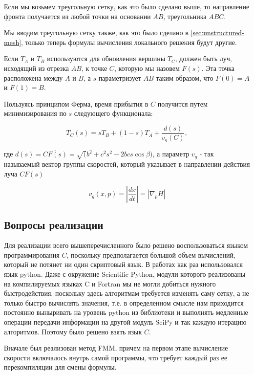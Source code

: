 Если мы возьмем треугольную сетку, как это было сделано выше, то
направление фронта получается из любой точки на основании $AB$,
треугольника $ABC$.

Мы вводим треугольную сетку также, как это было сделано в
\ref{sec:unstructured-mesh}, только теперь формулы вычисления
локального решения будут другие.

Если $T_A$ и $T_B$ используются для обновления вершины $T_C$, должен
быть луч, исходящий из отрезка $AB$, к точке $C$, которую мы назовем
$F(s)$. Эта точка расположена между $A$ и $B$, а $s$ параметризует
$AB$ таким образом, что $F(0)=A$ и $F(1) = B$.

Пользуясь принципом Ферма, время прибытия в $C$ получится путем
минимизирования по $s$ следующего функционала:

\begin{equation}
  \label{eq:2}
  T_C(s) = sT_B + (1-s)T_A + \frac{d(s)}{v_g(C)},
\end{equation}

где $d(s) = \overline{CF(s)} = \sqrt(b^2+c^2s^2-2bcs \cos \beta)$, а
параметр $v_g$ - так называемый вектор группы скоростей, который
указывает в направлении действия луча $CF(s)$

\begin{equation}
  \label{eq:3}
  v_g(x,p) = \left| \frac{dx}{dt} \right| = \left| \nabla_p H  \right|
\end{equation}


\subsection{Вопросы реализации}
\label{sec:programming}

Для реализации всего вышеперечисленного было решено воспользоваться
языком программирования $C$, поскольку предполагается большой объем
вычислений, который не потянет ни один скриптовый язык. В работах
\cite{AVS2016, AV2015_1, AV2015_2} как раз использовался язык
python. Даже с окружение Scientific Python, модули которого
реализованы на компилируемых языках C и Fortran мы не могли добиться
нужного быстродействия, поскольку здесь алгоритмам требуется изменять
саму сетку, а не только быстро вычислять значения, т.е. в определенном
смысле нам приходится постоянно выныривать на уровень python из
библиотеки и выполнять медленные операции передачи информации на
другой модуль SciPy и так каждую итерацию алгоритмов. Поэтому было
решено взять язык $C$.

Вначале был реализован метод FMM, причем на первом этапе вычисление
скорости включалось внутрь самой программы, что требует каждый раз ее
перекомпиляции для смены формулы.

